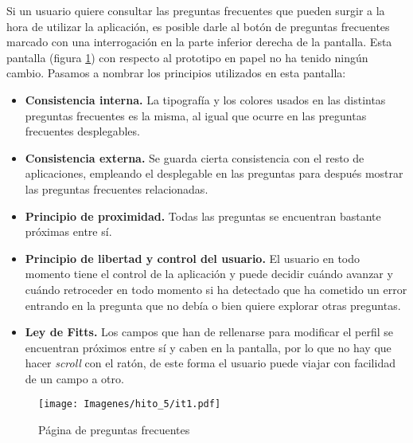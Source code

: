 Si un usuario quiere consultar las preguntas frecuentes que pueden surgir a la hora de utilizar la aplicación,
es posible darle al botón de preguntas frecuentes marcado con una interrogación en la parte inferior derecha
de la pantalla. Esta pantalla (figura \ref{fig:it1_faq}) con respecto al prototipo en papel no ha tenido ningún cambio. Pasamos a nombrar
los principios utilizados en esta pantalla:

\begin{itemize}
    \item \textbf{Consistencia interna.} La tipografía y los colores usados en las distintas preguntas frecuentes
        es la misma, al igual que ocurre en las preguntas frecuentes desplegables. 
    \item \textbf{Consistencia externa.} Se guarda cierta consistencia con el resto de aplicaciones, empleando el
        desplegable en las preguntas para después mostrar las preguntas frecuentes relacionadas.
    \item \textbf{Principio de proximidad.} Todas las preguntas se encuentran bastante próximas entre sí.
    \item \textbf{Principio de libertad y control del usuario.} El usuario en todo momento tiene el control de la
        aplicación y puede decidir cuándo avanzar y cuándo retroceder en todo momento si ha detectado que ha cometido
        un error entrando en la pregunta que no debía o bien quiere explorar otras preguntas.
    \item \textbf{Ley de Fitts.} Los campos que han de rellenarse para modificar el perfil se encuentran próximos
        entre sí y caben en la pantalla, por lo que no hay que hacer \textit{scroll} con el ratón, de este forma el
        usuario puede viajar con facilidad de un campo a otro.
\end{itemize}

\begin{figure}[H]
    \centering
    \texttt{[image: Imagenes/hito\_5/it1.pdf]}
    \caption{Página de preguntas frecuentes}
    \label{fig:it1_faq}
\end{figure}